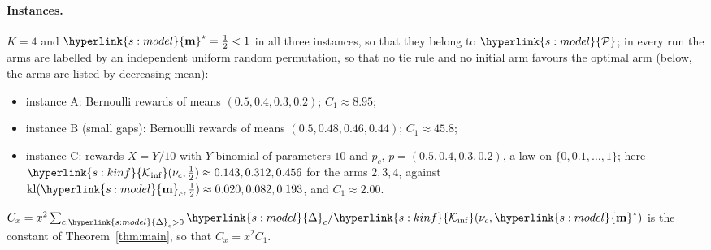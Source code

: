 \documentclass[10pt]{article}
\newcommand{\sy}[2]{{\hyperlink{#1}{#2}}}
\newcommand{\1}{\mathbf{1}}
\newcommand{\kl}{\mathrm{kl}}
\newcommand{\m}{\sy{s:model}{\mathbf{m}}}
\newcommand{\cP}{\sy{s:model}{\mathcal P}}
\newcommand{\Dg}{\sy{s:model}{\Delta}}
\newcommand{\Ki}{\sy{s:kinf}{\mathcal K_{\inf}}}
\begin{document}
\paragraph{Instances.} $K=4$ and $\m^\star=\frac12<1$ in all three instances, so that they belong to $\cP$; in every run the arms are labelled by an
independent uniform random permutation, so that no tie rule and no initial arm favours the optimal arm (below, the arms are listed by decreasing mean):
\begin{itemize}[leftmargin=*,nosep]
\item instance A: Bernoulli rewards of means $(0.5,0.4,0.3,0.2)$; $C_1\approx8.95$;
\item instance B (small gaps): Bernoulli rewards of means $(0.5,0.48,0.46,0.44)$; $C_1\approx45.8$;
\item instance C: rewards $X=Y/10$ with $Y$ binomial of parameters $10$ and $p_c$, $p=(0.5,0.4,0.3,0.2)$, a law on $\{0,0.1,\dots,1\}$; here
$\Ki(\nu_c,\frac12)\approx0.143,0.312,0.456$ for the arms $2,3,4$, against $\kl(\m_c,\frac12)\approx0.020,0.082,0.193$, and $C_1\approx2.00$.
\end{itemize}
$C_x=x^2\sum_{c:\Dg_c>0}\Dg_c/\Ki(\nu_c,\m^\star)$ is the constant of Theorem~\ref{thm:main}, so that $C_x=x^2C_1$.
\end{document}
